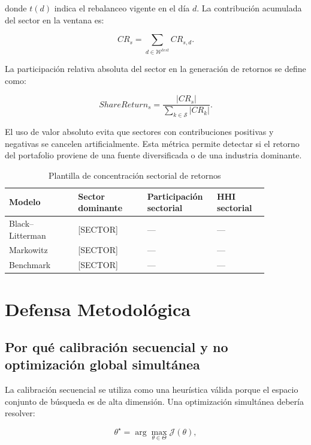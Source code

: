 \documentclass[11pt]{article}
\begin{document}
donde $t(d)$ indica el rebalanceo vigente en el d\'ia $d$. La contribuci\'on acumulada del sector en la ventana es:

\begin{equation}
    CR_s
    =
    \sum_{d \in \mathcal{W}^{test}}
    CR_{s,d}.
\end{equation}

La participaci\'on relativa absoluta del sector en la generaci\'on de retornos se define como:

\begin{equation}
    ShareReturn_s
    =
    \frac{
    |CR_s|
    }{
    \sum_{k \in \mathcal{S}} |CR_k|
    }.
\end{equation}

El uso de valor absoluto evita que sectores con contribuciones positivas y negativas se cancelen artificialmente. Esta m\'etrica permite detectar si el retorno del portafolio proviene de una fuente diversificada o de una industria dominante.

\begin{table}[H]
\centering
\caption{Plantilla de concentraci\'on sectorial de retornos}
\begin{tabular}{p{0.24\linewidth} p{0.24\linewidth} p{0.20\linewidth} p{0.18\linewidth}}
\toprule
Modelo & Sector dominante & Participaci\'on sectorial & HHI sectorial \\
\midrule
Black--Litterman & [SECTOR] & --- & --- \\
Markowitz & [SECTOR] & --- & --- \\
Benchmark & [SECTOR] & --- & --- \\
\bottomrule
\end{tabular}
\end{table}

\section{Defensa Metodol\'ogica}

\subsection{Por qu\'e calibraci\'on secuencial y no optimizaci\'on global simult\'anea}

La calibraci\'on secuencial se utiliza como una heur\'istica v\'alida porque el espacio conjunto de b\'usqueda es de alta dimensi\'on. Una optimizaci\'on simult\'anea deber\'ia resolver:

\begin{equation}
    \theta^\star
    =
    \arg\max_{\theta \in \Theta}
    \mathcal{J}(\theta),
\end{equation}
\end{document}
